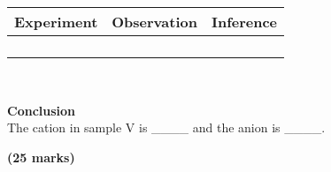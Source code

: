 \begin{enumerate}
\begin{center}
\begin{tabular}{|p{4cm}|p{4cm}|p{4cm}|}
\hline
\textbf{Experiment}&\textbf{Observation}&\textbf{Inference}\\ \hline
&&\\
&&\\
&&\\
&&\\
\hline
\end{tabular}\\
\end{center}

\textbf{Conclusion}\\

The cation in sample V is \_\_\_\_ and the anion is \_\_\_\_.\\

\end{enumerate}

\raggedleft \textbf{(25 marks)}\\

\raggedright
